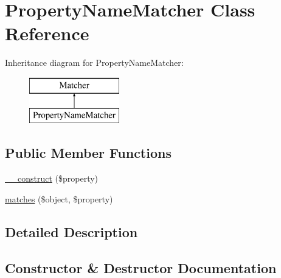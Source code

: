 \hypertarget{class_deep_copy_1_1_matcher_1_1_property_name_matcher}{}\section{Property\+Name\+Matcher Class Reference}
\label{class_deep_copy_1_1_matcher_1_1_property_name_matcher}
Inheritance diagram for Property\+Name\+Matcher\+:\begin{figure}[H]
\begin{center}
\leavevmode
\includegraphics[height=2.000000cm]{class_deep_copy_1_1_matcher_1_1_property_name_matcher}
\end{center}
\end{figure}
\subsection*{Public Member Functions}
\begin{DoxyCompactItemize}
\item 
\mbox{\hyperlink{class_deep_copy_1_1_matcher_1_1_property_name_matcher_a036791cb7a61f37d5a73b69b99903436}{\+\_\+\+\_\+construct}} (\$property)
\item 
\mbox{\hyperlink{class_deep_copy_1_1_matcher_1_1_property_name_matcher_a2e9fdbe8d1a508d5c5ee7c81d27d77ea}{matches}} (\$object, \$property)
\end{DoxyCompactItemize}


\subsection{Detailed Description}


\subsection{Constructor \& Destructor Documentation}
\mbox{\label{class_deep_copy_1_1_matcher_1_1_property_name_matcher_a036791cb7a61f37d5a73b69b99903436}} 
